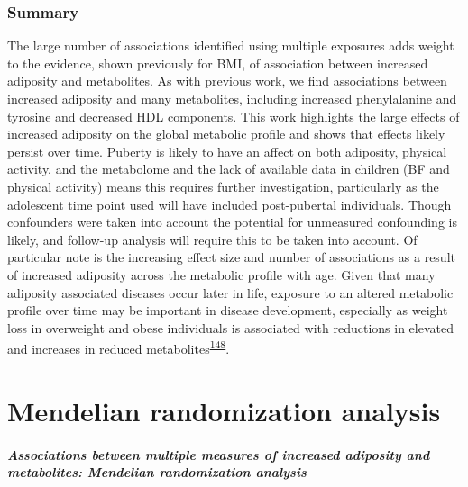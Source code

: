 \documentclass[11pt,twoside]{bristolthesis}
\begin{document}
\hypertarget{summary}{%
\subsection{Summary}\label{summary}}

The large number of associations identified using multiple exposures adds weight to the evidence, shown previously for BMI, of association between increased adiposity and metabolites. As with previous work, we find associations between increased adiposity and many metabolites, including increased phenylalanine and tyrosine and decreased HDL components. This work highlights the large effects of increased adiposity on the global metabolic profile and shows that effects likely persist over time. Puberty is likely to have an affect on both adiposity, physical activity, and the metabolome and the lack of available data in children (BF and physical activity) means this requires further investigation, particularly as the adolescent time point used will have included post-pubertal individuals. Though confounders were taken into account the potential for unmeasured confounding is likely, and follow-up analysis will require this to be taken into account. Of particular note is the increasing effect size and number of associations as a result of increased adiposity across the metabolic profile with age. Given that many adiposity associated diseases occur later in life, exposure to an altered metabolic profile over time may be important in disease development, especially as weight loss in overweight and obese individuals is associated with reductions in elevated and increases in reduced metabolites\textsuperscript{\protect\hyperlink{ref-Rangel-Huerta2019}{148}}.

\hypertarget{chapter5}{%
\chapter{Mendelian randomization analysis}\label{chapter5}}

\hypertarget{associations-between-multiple-measures-of-increased-adiposity-and-metabolites-mendelian-randomization-analysis}{%
\subsubsection{\texorpdfstring{\emph{Associations between multiple measures of increased adiposity and metabolites: Mendelian randomization analysis}}{Associations between multiple measures of increased adiposity and metabolites: Mendelian randomization analysis}}\label{associations-between-multiple-measures-of-increased-adiposity-and-metabolites-mendelian-randomization-analysis}}
\end{document}
